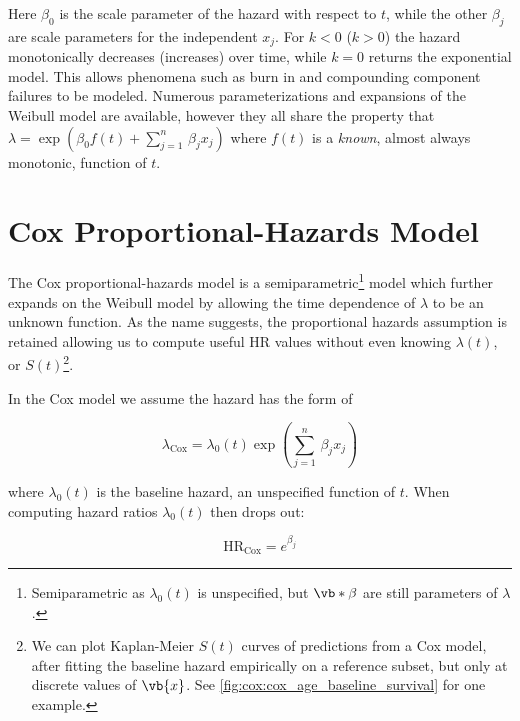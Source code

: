 \noindent Here $\beta_{0}$ is the scale parameter of the hazard with respect to $t$,
while the other $\beta_{j}$ are scale parameters for the independent $x_{j}$.
For $k<0$ ($k>0$) the hazard monotonically decreases (increases) over time,
while $k=0$ returns the exponential model.
This allows phenomena such as burn in and compounding component failures to be modeled.
Numerous parameterizations and expansions of the Weibull model are available,
however they all share the property that
$\lambda = \exp\left(\beta_{0} f\left(t\right) + \sum_{j=1}^{n}\, \beta_{j} x_{j}\right)$
where $f\left(t\right)$ is a {\em known}, almost always monotonic, function of $t$.

\section{Cox Proportional-Hazards Model}
\label{survival:cox}

The Cox proportional-hazards model \cite{cox} is a
semiparametric\footnote{Semiparametric as $\lambda_{0}\left(t\right)$ is unspecified, but $\vb*{\beta}$ are still parameters of $\lambda$.} model
which further expands on the Weibull model by allowing
the time dependence of $\lambda$ to be an unknown function.
As the name suggests, the proportional hazards assumption is retained
allowing us to compute useful HR values
without even knowing $\lambda\left(t\right)$,
or $S\left(t\right)$\footnote{We can
plot Kaplan-Meier $S\left(t\right)$ curves of predictions from a Cox model,
after fitting the baseline hazard empirically on a reference subset,
but only at discrete values of $\vb{x}$.
See \cref{fig:cox:cox_age_baseline_survival} for one example.}.

In the Cox model we assume the hazard has the form of

\begin{equation}\label{eq:survival:cox_lambda}
\lambda_{\text{Cox}} = \lambda_{0}\left(t\right) \exp\left(\sum_{j=1}^{n}\, \beta_{j} x_{j}\right)
\end{equation}

\noindent where $\lambda_{0}\left(t\right)$ is the baseline hazard, an unspecified function of $t$.
When computing hazard ratios $\lambda_{0}\left(t\right)$ then drops out:

\begin{equation}\label{eq:survival:cox_HR}
\text{HR}_{\text{Cox}} = e^{\beta_{j}}
\end{equation}

